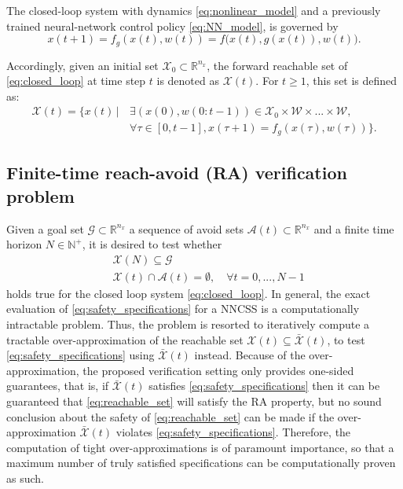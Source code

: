 \documentclass[journal]{IEEEtran}
\begin{document}
The closed-loop system  with dynamics \eqref{eq:nonlinear_model} and a previously trained neural-network control policy \eqref{eq:NN_model}, is governed by
\begin{equation} \label{eq:closed_loop}
    x(t+1) = f_g(x(t),w(t)) =  f\big(x(t),g(x(t)),w(t) \big).
\end{equation}

Accordingly, given an initial set $\mathcal{X}_0 \subset \mathbb{R}^{n_x}$, the forward reachable set of \eqref{eq:closed_loop} at time step $t$  is denoted as $\mathcal{X}(t)$. For $t\geq 1$, this set is defined as: 
\begin{equation} \label{eq:reachable_set}
\begin{aligned}
          \mathcal{X}(t) = \big\{x(t) \, |& \,  \exists (x(0), w(0:t-1)) \in \mathcal{X}_0 \times \mathcal{W} \times ... \times \mathcal{W}, \\
       & \, \forall \tau \in [0, t-1], x(\tau +1) = f_g(x(\tau),w(\tau)) \big \}. 
\end{aligned}
\end{equation}


\subsection{Finite-time reach-avoid (RA) verification problem}

Given a goal set $\mathcal{G} \subset \mathbb{R}^{n_x}$ a sequence of avoid sets $\mathcal{A}(t) \subset \mathbb{R}^{n_x}$ and a finite time horizon $N \in \mathbb{N}^+$, it is desired to test whether  
\begin{equation}\label{eq:safety_specifications}
  \begin{aligned}
    &\mathcal{X}(N) \subseteq \mathcal{G} \\
    &\mathcal{X}(t) \cap \mathcal{A}(t) = \emptyset, \quad \forall t = 0,...,N-1
\end{aligned}  
\end{equation}
\noindent holds true for the closed loop system \eqref{eq:closed_loop}. In general, the exact evaluation of \eqref{eq:safety_specifications} for a NNCSS is a computationally intractable problem.  Thus, the problem is resorted to iteratively compute a tractable  over-approximation of the reachable set $\mathcal{X}(t) \subseteq \bar{\mathcal{X}}(t)$, to test \eqref{eq:safety_specifications} using $\bar{\mathcal{X}}(t)$ instead. Because of the over-approximation, the proposed verification setting only provides one-sided guarantees, that is, if  $\bar{\mathcal{X}}(t)$ satisfies \eqref{eq:safety_specifications} then it can be guaranteed that \eqref{eq:reachable_set} will satisfy the RA property, but no sound conclusion about the safety of \eqref{eq:reachable_set} can be made if the over-approximation $\bar{\mathcal{X}}(t)$ violates \eqref{eq:safety_specifications}. Therefore, the computation of tight over-approximations is of paramount importance, so that a maximum number of truly satisfied specifications can be computationally proven as such.
\end{document}
